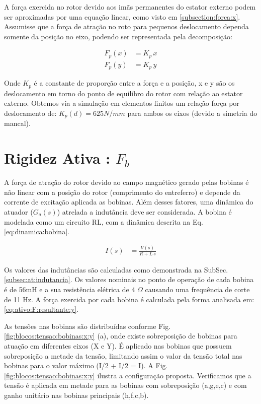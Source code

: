 A força exercida no rotor devido aos imãs permanentes do estator externo podem ser aproximadas por uma equação linear, como visto em \ref{subsection:forca:x}. Assumisse que a força de atração no roto para pequenos deslocamento dependa somente da posição no eixo, podendo ser representada pela decomposição:

\begin{align}
	F_p(x) &= K_p \, x \\
	F_p(y) &= K_p \, y 
\end{align}

Onde $K_p$ é a constante de proporção entre a força e a posição, x e y são os deslocamento em torno do ponto de equilibro do rotor com relação ao estator externo. Obtemos via a simulação em elementos finitos um relação força por deslocamento de: $ K_p(d) = 625 N/mm $  para ambos os eixos (devido a simetria do mancal). 

\section{Rigidez Ativa : $F_b$}

A força de atração do rotor devido ao campo magnético gerado pelas bobinas é não linear com a posição do rotor (comprimento do entreferro) e depende da corrente de excitação aplicada as bobinas. Além desses fatores, uma dinâmica do atuador ($G_a(s)$) atrelada a indutância deve ser considerada. A bobina é modelada como um circuito RL, com a dinâmica descrita na Eq. \eqref{eq:dinamica:bobina}.


\begin{align}
	I(s) &= \frac{V(s)}{R + L \, s} 
	\label{eq:dinamica:bobina}
\end{align}

Os valores das indutâncias são calculadas como demonstrada na SubSec. \ref{subsec:at:indutancia}. Os valores nominais no ponto de operação de cada bobina é de 56mH  e a sua resistência elétrica de 4 $\Omega$  causando uma frequência de corte de 11 Hz. A força exercida por cada bobina é calculada pela forma analisada em: \eqref{eq:ativo:F:resultante:y}. 

As tensões nas bobinas são distribuídas conforme Fig. \ref{fig:blocos:tensao:bobinas:x:y} (a), onde existe sobreposição de bobinas para atuação em diferentes eixos (X e Y). É aplicado nas bobinas que possuem sobreposição a metade da tensão, limitando assim o valor da tensão total nas bobinas para o valor máximo (I/2 + I/2 = I). A Fig. \ref{fig:blocos:tensao:bobinas:x:y} ilustra a configuração proposta. Verificamos que a tensão é aplicada em metade para as bobinas com sobreposição (a,g,e,c) e com ganho unitário nas bobinas principais (h,f,c,b). 

